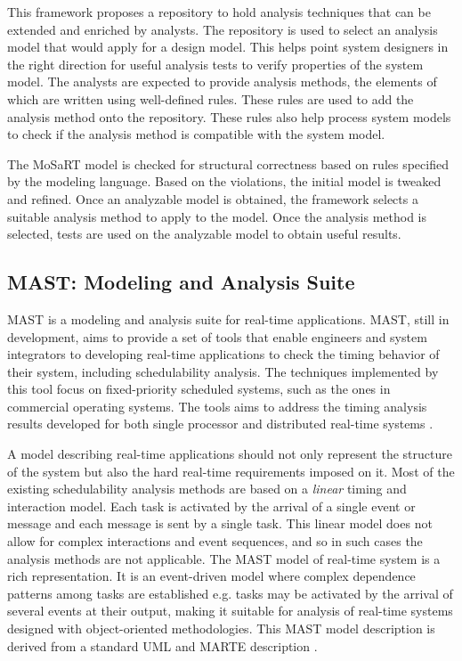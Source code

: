 This framework proposes a repository to hold analysis techniques that can be extended and enriched by analysts. The repository is used to select an analysis model that would apply for a design model. This helps point system designers in the right direction for useful analysis tests to verify properties of the system model. The analysts are expected to provide analysis methods, the elements of which are written using well-defined rules. These rules are used to add the analysis method onto the repository. These rules also help process system models to check if the analysis method is compatible with the system model.

The MoSaRT model is checked for structural correctness based on rules specified by the modeling language. Based on the violations, the initial model is tweaked and refined. Once an analyzable model is obtained, the framework selects a suitable analysis method to apply to the model. Once the analysis method is selected, tests are used on the analyzable model to obtain useful results.

\subsection{MAST: Modeling and Analysis Suite}

MAST \cite{934015} is a modeling and analysis suite for real-time applications. MAST, still in development, aims to provide a set of tools that enable engineers and system integrators to developing real-time applications to check the timing behavior of their system, including schedulability analysis. The techniques implemented by this tool focus on fixed-priority scheduled systems, such as the ones in commercial operating systems. The tools aims to address the timing analysis results developed for both single processor \cite{liu1973scheduling, klein2012practitioner} and distributed real-time systems \cite{palencia1999exploiting, tindell1994holistic}. 

A model describing real-time applications should not only represent the structure of the system but also the hard real-time requirements imposed on it. Most of the existing schedulability analysis methods are based on a \emph{linear} timing and interaction model. Each task is activated by the arrival of a single event or message and each message is sent by a single task. This linear model does not allow for complex interactions and event sequences, and so in such cases the analysis methods are not applicable. The MAST model of real-time system is a rich representation. It is an event-driven model where complex dependence patterns among tasks are established e.g. tasks may be activated by the arrival of several events at their output, making it suitable for analysis of real-time systems designed with object-oriented methodologies. This MAST model description is derived from a standard UML and MARTE description \cite{medina2011}. 


